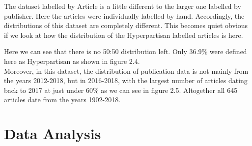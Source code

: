 \documentclass[a4paper, 11pt,titlepage,oneside,openany]{book}
\begin{document}
The dataset labelled by Article is a little different to the larger one labelled by publisher. Here the articles were individually labelled by hand. Accordingly, the distributions of this dataset are completely different. This becomes quiet obvious if we look at how the distribution of the Hyperpartisan labelled articles is here.
\begin{figure}[h]
\end{figure}
\noindent Here we can see that there is no 50:50 distribution left. Only 36.9\% were defined here as Hyperpartisan as shown in figure 2.4.\\
\noindent Moreover, in this dataset, the distribution of publication data is not mainly from the years 2012-2018, but in 2016-2018, with the largest number of articles dating back to 2017 at just under 60\% as we can see in figure 2.5. Altogether all 645 articles date from the years 1902-2018.

\section{Data Analysis}
\end{document}
